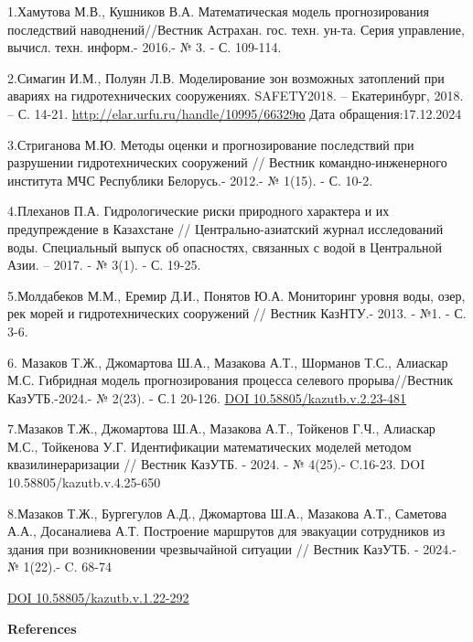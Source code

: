 \begin{references}
1.Хамутова М.В., Кушников В.А. Математическая модель прогнозирования
последствий наводнений//Вестник Астрахан. гос. техн. ун-та. Серия
управление, вычисл. техн. информ.- 2016.- № 3. - С. 109-114.

2.Симагин И.М., Полуян Л.В. Моделирование зон возможных затоплений при
авариях на гидротехнических сооружениях. SAFETY2018. -- Екатеринбург,
2018. -- С. 14-21. \url{http://elar.urfu.ru/handle/10995/66329ю} Дата
обращения:17.12.2024

3.Стриганова М.Ю. Методы оценки и прогнозирование последствий при
разрушении гидротехнических сооружений // Вестник командно-инженерного
института МЧС Республики Белорусь.- 2012.- № 1(15). - С. 10-2.

4.Плеханов П.А. Гидрологические риски природного характера и их
предупреждение в Казахстане // Центрально-азиатский журнал исследований
воды. Специальный выпуск об опасностях, связанных с водой в Центральной
Азии. -- 2017. - № 3(1). - С. 19-25.

5.Молдабеков М.М., Еремир Д.И., Понятов Ю.А. Мониторинг уровня воды,
озер, рек морей и гидротехнических сооружений // Вестник КазНТУ.- 2013.
- №1. - С. 3-6.

6. Мазаков Т.Ж., Джомартова Ш.А., Мазакова А.Т., Шорманов Т.С., Алиаскар
М.С. Гибридная модель прогнозирования процесса селевого прорыва//Вестник
КазУТБ.-2024.- № 2(23). - С.1 20-126.
\href{https://doi.org/10.58805/kazutb.v.2.23-481}{DOI
10.58805/kazutb.v.2.23-481}

7.Мазаков Т.Ж., Джомартова Ш.А., Мазакова А.Т., Тойкенов Г.Ч., Алиаскар
М.С., Тойкенова У.Г. Идентификации математических моделей методом
квазилинераризации // Вестник КазУТБ. - 2024. - № 4(25).- C.16-23. DOI
10.58805/kazutb.v.4.25-650

8.Мазаков Т.Ж., Бургегулов А.Д., Джомартова Ш.А., Мазакова А.Т.,
Саметова А.А., Досаналиева А.Т. Построение маршрутов для эвакуации
сотрудников из здания при возникновении чрезвычайной ситуации // Вестник
КазУТБ. - 2024.- № 1(22).- C. 68-74

\href{https://doi.org/10.58805/kazutb.v.1.22-292}{DOI
10.58805/kazutb.v.1.22-292}
\end{references}

\begin{center}
{\bfseries References}
\end{center}

